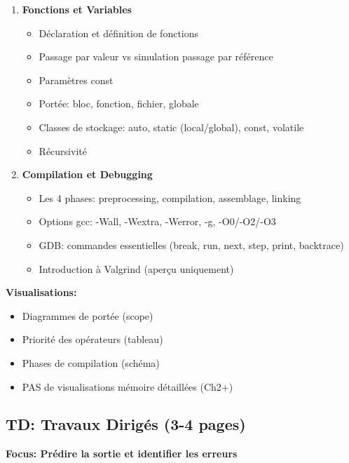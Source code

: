 \documentclass[10pt,a4paper]{article}
\begin{document}
\begin{enumerate}
\item \textbf{Fonctions et Variables}
   \begin{itemize}
   \item Déclaration et définition de fonctions
   \item Passage par valeur vs simulation passage par référence
   \item Paramètres const
   \item Portée: bloc, fonction, fichier, globale
   \item Classes de stockage: auto, static (local/global), const, volatile
   \item Récursivité
   \end{itemize}

\item \textbf{Compilation et Debugging}
   \begin{itemize}
   \item Les 4 phases: preprocessing, compilation, assemblage, linking
   \item Options gcc: -Wall, -Wextra, -Werror, -g, -O0/-O2/-O3
   \item GDB: commandes essentielles (break, run, next, step, print, backtrace)
   \item Introduction à Valgrind (aperçu uniquement)
   \end{itemize}
\end{enumerate}

\textbf{Visualisations:}
\begin{itemize}
\item Diagrammes de portée (scope)
\item Priorité des opérateurs (tableau)
\item Phases de compilation (schéma)
\item PAS de visualisations mémoire détaillées (Ch2+)
\end{itemize}

\subsection*{TD: Travaux Dirigés (3-4 pages)}

\textbf{Focus: Prédire la sortie et identifier les erreurs}
\end{document}
